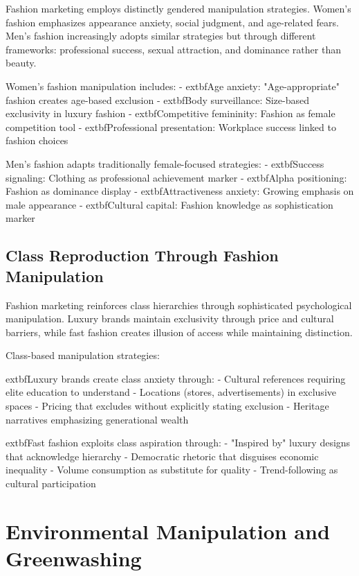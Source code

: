 Fashion marketing employs distinctly gendered manipulation strategies. Women's fashion emphasizes appearance anxiety, social judgment, and age-related fears. Men's fashion increasingly adopts similar strategies but through different frameworks: professional success, sexual attraction, and dominance rather than beauty.

Women's fashion manipulation includes:
- 	extbf{Age anxiety}: "Age-appropriate" fashion creates age-based exclusion
- 	extbf{Body surveillance}: Size-based exclusivity in luxury fashion
- 	extbf{Competitive femininity}: Fashion as female competition tool
- 	extbf{Professional presentation}: Workplace success linked to fashion choices

Men's fashion adapts traditionally female-focused strategies:
- 	extbf{Success signaling}: Clothing as professional achievement marker
- 	extbf{Alpha positioning}: Fashion as dominance display
- 	extbf{Attractiveness anxiety}: Growing emphasis on male appearance
- 	extbf{Cultural capital}: Fashion knowledge as sophistication marker

\subsection{Class Reproduction Through Fashion Manipulation}

Fashion marketing reinforces class hierarchies through sophisticated psychological manipulation. Luxury brands maintain exclusivity through price and cultural barriers, while fast fashion creates illusion of access while maintaining distinction.

Class-based manipulation strategies:

	extbf{Luxury brands} create class anxiety through:
- Cultural references requiring elite education to understand
- Locations (stores, advertisements) in exclusive spaces
- Pricing that excludes without explicitly stating exclusion
- Heritage narratives emphasizing generational wealth

	extbf{Fast fashion} exploits class aspiration through:
- "Inspired by" luxury designs that acknowledge hierarchy
- Democratic rhetoric that disguises economic inequality
- Volume consumption as substitute for quality
- Trend-following as cultural participation

\section{Environmental Manipulation and Greenwashing}
\label{sec:fashion_environment}

